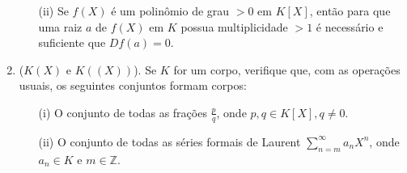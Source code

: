 \documentclass[a4paper,12pt]{article}
\begin{document}
\begin{enumerate}[label=5.\arabic*.]
\begin{enumerate}
        \item[(ii)] Se $f(X)$ é um polinômio de grau $>0$ em $K[X]$, então para que uma raiz $a$ de $f(X)$ em $K$ possua multiplicidade $>1$ é necessário e suficiente que $Df(a) = 0$.
    \end{enumerate}
    \item ($K(X)$ e $K((X))$). Se $K$ for um corpo, verifique que, com as operações usuais, os seguintes conjuntos formam corpos:
    \begin{enumerate}
        \item[(i)] O conjunto de todas as frações $\frac{p}{q}$, onde $p, q \in K[X], q \neq 0$.
        \item[(ii)] O conjunto de todas as séries formais de Laurent $\sum_{n=m}^{\infty} a_n X^n$, onde $a_n \in K$ e $m \in \mathbb{Z}$.
    \end{enumerate}
\end{enumerate}
\end{document}
